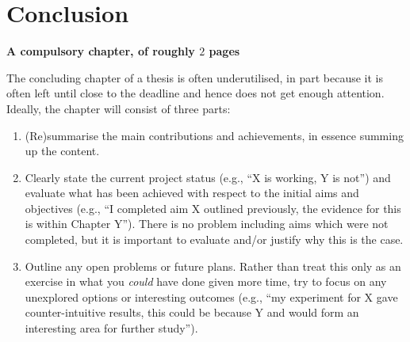 \documentclass[ %
                    author={Luke Murray},
                supervisor={Dr. Simon Hollis},
                     title={Shadow Peer-to-Peer Networks},
                  subtitle={},
                    degree={MEng},
                      year={2013} ]{thesis}
\begin{document}
\chapter{Conclusion}
\label{chap:conclusion}

{\bf A compulsory chapter, of roughly $2$ pages} 
\vspace{1cm} 

\noindent
The concluding chapter of a thesis is often underutilised, in part because
it is often left until close to the deadline and hence does not get enough 
attention.  Ideally, the chapter will consist of three parts:

\begin{enumerate}
\item (Re)summarise the main contributions and achievements, in essence
      summing up the content.
\item Clearly state the current project status (e.g., ``X is working, Y 
      is not'') and evaluate what has been achieved with respect to the 
      initial aims and objectives (e.g., ``I completed aim X outlined 
      previously, the evidence for this is within Chapter Y'').  There 
      is no problem including aims which were not completed, but it is 
      important to evaluate and/or justify why this is the case.
\item Outline any open problems or future plans.  Rather than treat this
      only as an exercise in what you {\em could} have done given more 
      time, try to focus on any unexplored options or interesting outcomes
      (e.g., ``my experiment for X gave counter-intuitive results, this 
      could be because Y and would form an interesting area for further 
      study'').
\end{enumerate}


%
%
\end{document}
